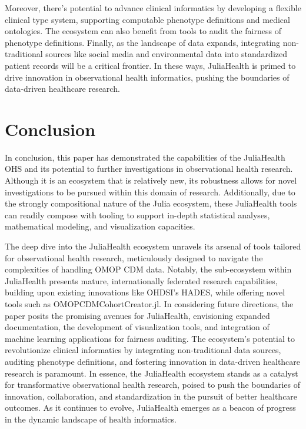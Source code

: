 \documentclass{juliacon}
\begin{document}
Moreover, there's potential to advance clinical informatics by developing a flexible clinical type system, supporting computable phenotype definitions and medical ontologies. The ecosystem can also benefit from tools to audit the fairness of phenotype definitions. Finally, as the landscape of data expands, integrating non-traditional sources like social media and environmental data into standardized patient records will be a critical frontier. In these ways, JuliaHealth is primed to drive innovation in observational health informatics, pushing the boundaries of data-driven healthcare research.

\section{Conclusion}

In conclusion, this paper has demonstrated the capabilities of the JuliaHealth OHS and its potential to further investigations in observational health research.
Although it is an ecosystem that is relatively new, its robustness allows for novel investigations to be pursued within this domain of research. 
Additionally, due to the strongly compositional nature of the Julia ecosystem, these JuliaHealth tools can readily compose with tooling to support in-depth statistical analyses, mathematical modeling, and visualization capacities.

The deep dive into the JuliaHealth ecosystem unravels its arsenal of tools tailored for observational health research, meticulously designed to navigate the complexities of handling OMOP CDM data. Notably, the sub-ecosystem within JuliaHealth presents mature, internationally federated research capabilities, building upon existing innovations like OHDSI's HADES, while offering novel tools such as OMOPCDMCohortCreator.jl.
In considering future directions, the paper posits the promising avenues for JuliaHealth, envisioning expanded documentation, the development of visualization tools, and integration of machine learning applications for fairness auditing. The ecosystem's potential to revolutionize clinical informatics by integrating non-traditional data sources, auditing phenotype definitions, and fostering innovation in data-driven healthcare research is paramount.
In essence, the JuliaHealth ecosystem stands as a catalyst for transformative observational health research, poised to push the boundaries of innovation, collaboration, and standardization in the pursuit of better healthcare outcomes. As it continues to evolve, JuliaHealth emerges as a beacon of progress in the dynamic landscape of health informatics.
\end{document}
